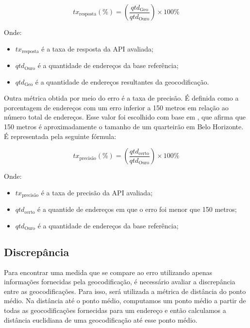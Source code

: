 \begin{equation}
tx_{\text{resposta}} (\%) = \left(\frac{qtd_{\text{Geo}}}{qtd_{\text{Ouro}}}\right) \times 100\%
\end{equation}

Onde:
\begin{itemize}
    \item $tx_{\text{resposta}}$ é a taxa de resposta da API avaliada;
    \item $qtd_{\text{Ouro}}$ é a quantidade de endereços da base referência;
    \item $qtd_{\text{Geo}}$ é a quantidade de endereços resultantes da geocodificação.
\end{itemize}

Outra métrica obtida por meio do erro é a taxa de precisão. É definida como a porcentagem de endereços com um erro inferior a 150 metros em relação ao número total de endereços. Esse valor foi escolhido com base em \cite{Clodoveu2011}, que afirma que  150 metros é aproximadamente o tamanho de um quarteirão em Belo Horizonte. É representada pela seguinte fórmula:

\begin{equation}
tx_{\text{precisão}} (\%) = \left(\frac{qtd_{\text{certo}}}{qtd_{\text{Ouro}}}\right) \times 100\%
\end{equation}

 Onde:
 \begin{itemize}
     \item $tx_{\text{precisão}}$ é a taxa de precisão da API avaliada;
     \item $qtd_{\text{certo}}$ é a quantide de endereços em que o erro foi menor que 150 metros;
     \item $qtd_{\text{Ouro}}$ é a quantidade de endereços da base referência;
 \end{itemize}

\subsection{Discrepância}
 
Para encontrar uma medida que se compare ao erro utilizando apenas informações fornecidas pela geocodificação, é necessário avaliar a discrepância entre as geocodificações. Para isso, será utilizada a métrica de distância do ponto médio. Na distância até o ponto médio, computamos um ponto médio a partir de todas as geocodificações fornecidas para um endereço e então calculamos a distância euclidiana de uma geocodificação até esse ponto médio.

